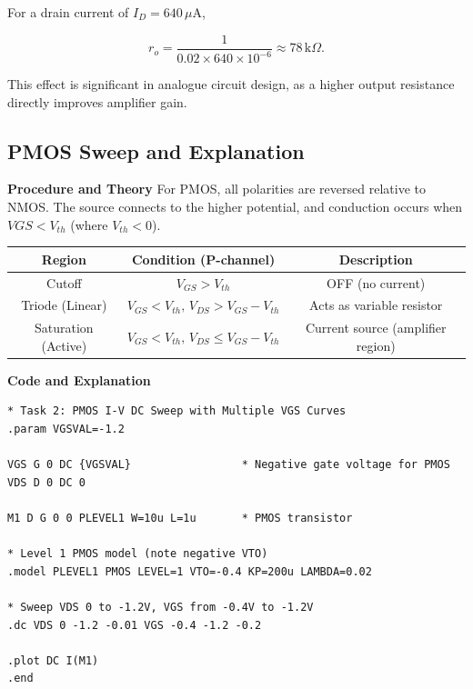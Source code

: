 \documentclass[a4paper,12pt]{article}
\begin{document}
For a drain current of $I_D = 640\,\mu\text{A}$,

\begin{equation}
r_o = \frac{1}{0.02 \times 640 \times 10^{-6}} \approx 78\,\text{k}\Omega.
\end{equation}

This effect is significant in analogue circuit design, as a higher output resistance directly improves amplifier gain.

\subsection{PMOS Sweep and Explanation}

\textbf{Procedure and Theory}
For PMOS, all polarities are reversed relative to NMOS. The source connects to the higher potential, and conduction occurs when $VGS < V_{th}$ (where $V_{th} < 0$).

\begin{center}
\begin{tabular}{|c|c|c|}
\hline
\textbf{Region} & \textbf{Condition (P-channel)} & \textbf{Description} \\
\hline
Cutoff & $V_{GS} > V_{th}$ & OFF (no current) \\
Triode (Linear) & $V_{GS} < V_{th}, \, V_{DS} > V_{GS}-V_{th}$ & Acts as variable resistor \\
Saturation (Active) & $V_{GS} < V_{th}, \, V_{DS} \le V_{GS}-V_{th}$ & Current source (amplifier region) \\
\hline
\end{tabular}
\end{center}

\textbf{Code and Explanation}

\begin{lstlisting}[caption=PMOS Sweep Simulation Code, label=lst:pmos_sweep]
* Task 2: PMOS I-V DC Sweep with Multiple VGS Curves
.param VGSVAL=-1.2

VGS G 0 DC {VGSVAL}                 * Negative gate voltage for PMOS
VDS D 0 DC 0

M1 D G 0 0 PLEVEL1 W=10u L=1u       * PMOS transistor

* Level 1 PMOS model (note negative VTO)
.model PLEVEL1 PMOS LEVEL=1 VTO=-0.4 KP=200u LAMBDA=0.02

* Sweep VDS 0 to -1.2V, VGS from -0.4V to -1.2V
.dc VDS 0 -1.2 -0.01 VGS -0.4 -1.2 -0.2

.plot DC I(M1)
.end
\end{lstlisting}
\end{document}
